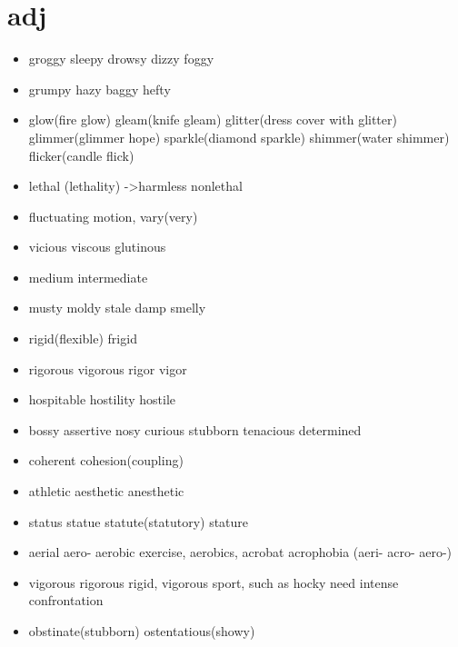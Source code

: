 \documentclass[a4paper,11pt,twoside]{book}
\begin{document}
	
\section{adj}
\begin{itemize}
	\item groggy sleepy drowsy dizzy foggy
	
	\item  grumpy hazy baggy hefty

	\item glow(fire glow) gleam(knife gleam) glitter(dress cover with glitter) glimmer(glimmer hope) sparkle(diamond sparkle) shimmer(water shimmer) flicker(candle flick)
	
	\item lethal (lethality) ->harmless nonlethal

	\item fluctuating motion, vary(very)
	
	\item vicious viscous glutinous
	
	\item medium intermediate

	\item musty moldy stale damp smelly
	
	\item rigid(flexible) frigid
	
	\item rigorous vigorous rigor vigor
	
	\item hospitable hostility hostile

	\item bossy assertive nosy curious stubborn tenacious determined

	\item coherent cohesion(coupling)
	 
	\item athletic aesthetic anesthetic 

	\item status statue statute(statutory) stature 

	\item aerial aero-  aerobic exercise, aerobics, acrobat acrophobia (aeri- acro- aero-)

	\item vigorous rigorous rigid, vigorous sport, such as hocky need intense confrontation
	
	\item obstinate(stubborn) ostentatious(showy)
	

\end{itemize}
\end{document}
